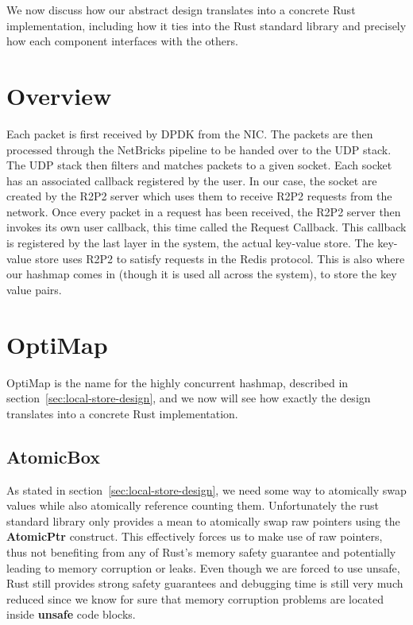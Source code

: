 We now discuss how our abstract design translates into a concrete Rust
implementation, including how it ties into the Rust standard library
and precisely how each component interfaces with the others.

\section{Overview}

Each packet is first received by DPDK from the NIC\@. The packets are
then processed through the NetBricks pipeline to be handed over to the
UDP stack. The UDP stack then filters and matches packets to a given
socket. Each socket has an associated callback registered by the
user. In our case, the socket are created by the R2P2 server which
uses them to receive R2P2 requests from the network. Once every packet
in a request has been received, the R2P2 server then invokes its own
user callback, this time called the Request Callback. This callback
is registered by the last layer in the system, the actual key-value
store. The key-value store uses R2P2 to satisfy requests in the Redis
protocol. This is also where our hashmap comes in (though it is used
all across the system), to store the key value pairs.

\section{OptiMap} \label{sec:optimap-impl}

OptiMap is the name for the highly concurrent hashmap, described in
section~\ref{sec:local-store-design}, and we now will see how exactly
the design translates into a concrete Rust implementation.

\subsection{AtomicBox}

As stated in section~\ref{sec:local-store-design}, we need some way to
atomically swap values while also atomically reference counting them.
Unfortunately the rust standard library only provides a mean to
atomically swap raw pointers using the \textbf{AtomicPtr}
construct. This effectively forces us to make use of raw pointers,
thus not benefiting from any of Rust's memory safety guarantee and
potentially leading to memory corruption or leaks. Even though we are
forced to use unsafe, Rust still provides strong safety guarantees and
debugging time is still very much reduced since we know for sure that
memory corruption problems are located inside \textbf{unsafe} code
blocks.

